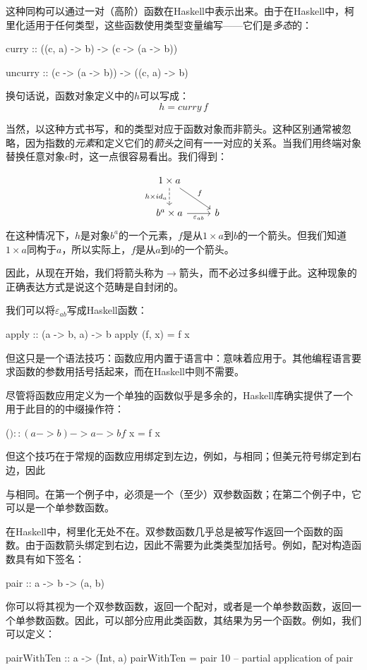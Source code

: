 \documentclass[DaoFP]{subfiles}
\begin{document}
 这种同构可以通过一对（高阶）函数在Haskell中表示出来。由于在Haskell中，柯里化适用于任何类型，这些函数使用类型变量编写——它们是\emph{多态}的：
 \begin{haskell}
  curry   :: ((c, a) -> b)   -> (c -> (a -> b))
 \end{haskell}

 \begin{haskell}
  uncurry :: (c -> (a -> b)) -> ((c, a) -> b)
 \end{haskell}
 换句话说，函数对象定义中的$h$可以写成：
 \[ h = curry\, f \]

 当然，以这种方式书写，和的类型对应于函数对象而非箭头。这种区别通常被忽略，因为指数的\emph{元素}和定义它们的\emph{箭头}之间有一一对应的关系。当我们用终端对象替换任意对象$c$时，这一点很容易看出。我们得到：

 \[
  \begin{tikzcd}
   1 \times a
   \arrow[d, dashed, "h \times id_a"']
   \arrow[rd, "f"]
   \\
   b^a \times a
   \arrow[r, "\varepsilon_{a b}"']
   & b
  \end{tikzcd}
 \]
 在这种情况下，$h$是对象$b^a$的一个元素，$f$是从$1 \times a$到$b$的一个箭头。但我们知道$1 \times a$同构于$a$，所以实际上，$f$是从$a$到$b$的一个箭头。

 因此，从现在开始，我们将\hask{->}箭头称为$\to$箭头，而不必过多纠缠于此。这种现象的正确表达方式是说这个范畴是自封闭的。

 我们可以将$\varepsilon_{a b}$写成Haskell函数：
 \begin{haskell}
  apply :: (a -> b, a) -> b
  apply (f, x) = f x
 \end{haskell}
 但这只是一个语法技巧：函数应用内置于语言中：意味着应用于。其他编程语言要求函数的参数用括号括起来，而在Haskell中则不需要。

 尽管将函数应用定义为一个单独的函数似乎是多余的，Haskell库确实提供了一个用于此目的的中缀操作符\hask{$}：
 \begin{haskell}
  ($) :: (a -> b) -> a -> b
f $ x = f x
\end{haskell}
但这个技巧在于常规的函数应用绑定到左边，例如，与相同；但美元符号绑定到右边，因此
与相同。在第一个例子中，必须是一个（至少）双参数函数；在第二个例子中，它可以是一个单参数函数。

在Haskell中，柯里化无处不在。双参数函数几乎总是被写作返回一个函数的函数。由于函数箭头\hask{->}绑定到右边，因此不需要为此类类型加括号。例如，配对构造函数具有如下签名：
\begin{haskell}
pair :: a -> b -> (a, b)
\end{haskell}
你可以将其视为一个双参数函数，返回一个配对，或者是一个单参数函数，返回一个单参数函数。因此，可以部分应用此类函数，其结果为另一个函数。例如，我们可以定义：
\begin{haskell}
pairWithTen :: a -> (Int, a)
pairWithTen = pair 10 -- partial application of pair
\end{haskell}
\end{document}
